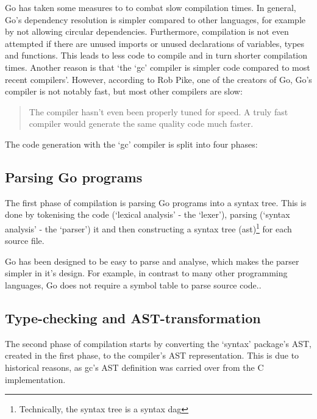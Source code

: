 Go has taken some measures to to combat slow compilation times. In general, Go's dependency resolution is simpler
compared to other languages, for example by not allowing circular dependencies.
Furthermore, compilation is not even attempted if there are unused
imports or unused declarations of variables, types and functions.
This leads to less code to compile and in turn shorter compilation times.
Another reason is that `the `gc' compiler is simpler code compared to most
recent compilers'\autocite{nuts-compiler}. However, according
to Rob Pike, one of the creators of Go, Go's compiler is not notably fast, but
most other compilers are slow:

\begin{quote}
    The compiler hasn't even been properly tuned for speed. A truly fast compiler
    would generate the same quality code much faster.\autocite{nuts-compiler}
\end{quote}

The code generation with the `gc' compiler is split into four phases:

\subsection{Parsing Go programs}


The first phase of compilation is parsing Go programs into a syntax tree. This
is done by tokenising the code (`lexical analysis' - the `lexer'), parsing
(`syntax analysis' - the `parser') it and then constructing a syntax tree
(\gls{ast})\footnote{Technically, the syntax tree is a syntax \gls{dag}\autocite{ast-node-dag}}
for each source file.

Go has been designed to be easy to parse and analyse, which makes the parser
simpler in it's design. For example, in contrast to many other programming languages,
Go does not require a symbol table to parse source code.\autocite{go-faq-symbol}.

\subsection{Type-checking and AST-transformation}\label{sec:comp-type}

The second phase of compilation starts by converting the `syntax' package's
AST, created in the first phase, to the compiler's AST representation. This
is due to historical reasons, as gc's AST definition was carried over
from the C implementation.

